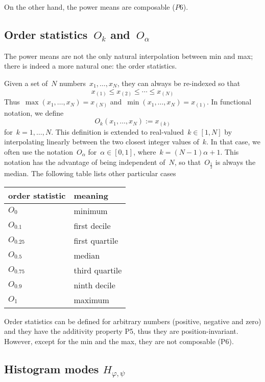 On the other hand, the power means are composable ($P6$).

\subsection{Order statistics~$O_k$ and~$O_{\alpha}$}

The power means are not the only natural interpolation between min
and max; there is indeed a more natural one: the order statistics.

Given a set of~$N$ numbers~$x_1,\ldots,x_N$, they can always be
re-indexed so that
\[
	x_{(1)} \le x_{(2)} \le \cdots \le x_{(N)}
\]
Thus~$\max(x_1,\ldots,x_N)=x_{(N)}$
and~$\min(x_1,\ldots,x_N)=x_{(1)}$.  In functional notation, we
define
\[
	O_k(x_1,\ldots,x_N) := x_{(k)}
\]
for~$k=1,\ldots,N$.  This definition is extended to
real-valued~$k\in[1,N]$ by interpolating linearly between the
two closest integer values of~$k$.  In that case, we often use the
notation~$O_{\alpha}$ for~$\alpha\in[0,1]$, where~$k=(N-1)\alpha+1$.
This notation has the advantage of being independent of~$N$, so
that~$O_{\frac{1}{2}}$ is always the median.  The following table
lists other particular cases

\medskip

\begin{tabular}{l|l}
	order statistic & meaning \\
	\hline
	$O_0$ & minimum \\
	$O_{0.1}$ & first decile \\
	$O_{0.25}$ & first quartile \\
	$O_{0.5}$ & median \\
	$O_{0.75}$ & third quartile \\
	$O_{0.9}$ & ninth decile \\
	$O_1$ & maximum \\
\end{tabular}

\medskip

Order statistics can be defined for arbitrary numbers (positive,
negative and zero) and they have the additivity property P5, thus
they are position-invariant.  However, except for the min and the
max, they are not composable (P6).


\subsection{Histogram modes $H_{\varphi,\psi}$}

